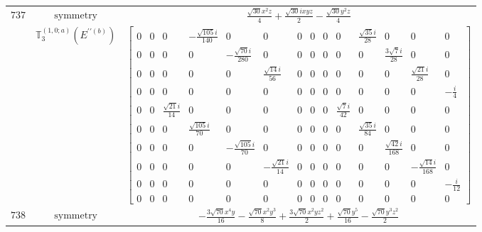 \documentclass[fleqn,8pt,landscape]{jsarticle}
\begin{document}
\begin{longtable}{ccc}
$ 737 $ & $ \text{symmetry} $ & $ \frac{\sqrt{30} x^{2} z}{4} + \frac{\sqrt{30} i x y z}{2} - \frac{\sqrt{30} y^{2} z}{4} $ \\
$  $ & $ \mathbb{T}_{3}^{(1,0;a)}(E^{\prime\prime(b)}) $ & $ \begin{bmatrix} 0 & 0 & 0 & - \frac{\sqrt{105} i}{140} & 0 & 0 & 0 & 0 & 0 & 0 & \frac{\sqrt{35} i}{28} & 0 & 0 & 0 \\ 0 & 0 & 0 & 0 & - \frac{\sqrt{70} i}{280} & 0 & 0 & 0 & 0 & 0 & 0 & \frac{3 \sqrt{7} i}{28} & 0 & 0 \\ 0 & 0 & 0 & 0 & 0 & \frac{\sqrt{14} i}{56} & 0 & 0 & 0 & 0 & 0 & 0 & \frac{\sqrt{21} i}{28} & 0 \\ 0 & 0 & 0 & 0 & 0 & 0 & 0 & 0 & 0 & 0 & 0 & 0 & 0 & - \frac{i}{4} \\ 0 & 0 & \frac{\sqrt{21} i}{14} & 0 & 0 & 0 & 0 & 0 & 0 & \frac{\sqrt{7} i}{42} & 0 & 0 & 0 & 0 \\ 0 & 0 & 0 & \frac{\sqrt{105} i}{70} & 0 & 0 & 0 & 0 & 0 & 0 & \frac{\sqrt{35} i}{84} & 0 & 0 & 0 \\ 0 & 0 & 0 & 0 & - \frac{\sqrt{105} i}{70} & 0 & 0 & 0 & 0 & 0 & 0 & \frac{\sqrt{42} i}{168} & 0 & 0 \\ 0 & 0 & 0 & 0 & 0 & - \frac{\sqrt{21} i}{14} & 0 & 0 & 0 & 0 & 0 & 0 & - \frac{\sqrt{14} i}{168} & 0 \\ 0 & 0 & 0 & 0 & 0 & 0 & 0 & 0 & 0 & 0 & 0 & 0 & 0 & - \frac{i}{12} \\ 0 & 0 & 0 & 0 & 0 & 0 & 0 & 0 & 0 & 0 & 0 & 0 & 0 & 0 \end{bmatrix} $ \\ \hline
$ 738 $ & $ \text{symmetry} $ & $ - \frac{3 \sqrt{70} x^{4} y}{16} - \frac{\sqrt{70} x^{2} y^{3}}{8} + \frac{3 \sqrt{70} x^{2} y z^{2}}{2} + \frac{\sqrt{70} y^{5}}{16} - \frac{\sqrt{70} y^{3} z^{2}}{2} $ \\

\end{longtable}
\end{document}
